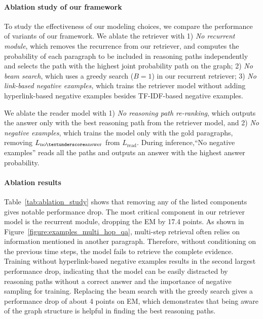 \vspace{-2mm}
\paragraph{Ablation study of our framework}
To study the effectiveness of our modeling choices, we compare the performance of variants of our framework.
We ablate the retriever with 1) {\it  No recurrent module}, which removes the recurrence from our retriever,
and computes the probability of each paragraph to be included in reasoning paths independently and selects the path with the highest joint probability path on the graph;
2) {\it No beam search}, which uses a greedy search ($B=1$) in our recurrent retriever;
3) {\it No  link-based negative examples,} which trains the retriever model without adding hyperlink-based negative examples besides TF-IDF-based negative examples.

We ablate the reader model with 1) {\it No reasoning path re-ranking}, which outputs the answer only with the best reasoning path from the retriever model, and 
2) {\it No negative examples}, which trains the model only with the gold paragraphs, removing  $L_\mathrm{no\textunderscore answer}$ from $L_\mathrm{read}$. 
During inference,``No negative examples'' reads all the paths and outputs an answer with the highest answer probability.

\vspace{-3mm}\paragraph{Ablation results}
Table~\ref{tab:ablation_study} shows that removing any of the listed components gives notable performance drop.
The most critical component in our retriever model is the recurrent module, dropping the EM by 17.4 points. 
As shown in Figure~\ref{figure:examples_multi_hop_qa}, multi-step retrieval often relies on information mentioned in another paragraph. 
Therefore, without conditioning on the previous time steps, the model fails to retrieve the complete evidence.
Training without hyperlink-based negative examples results in the second largest performance drop, indicating that the model can be easily distracted by reasoning paths without a correct answer and the importance of negative sampling for training.
Replacing the beam search with the greedy search gives a performance drop of about 4 points on EM, which demonstrates that being aware of the graph structure is helpful in finding the best reasoning paths.

